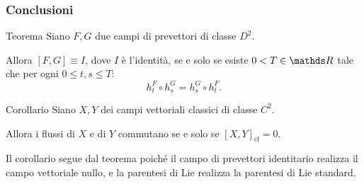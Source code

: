 \documentclass{beamer}
\newenvironment{teoremab}{\begin{alertblock}{Teorema}}{\end{alertblock}}
\newenvironment{corollariob}{\begin{alertblock}{Corollario}}{\end{alertblock}}
\begin{document}


    
    

\begin{frame}
    \frametitle{Conclusioni}

    \begin{teoremab}
        Siano $ F,G $ due campi di prevettori di classe $ D^{2} $. 

        Allora  $ [F,G]\equiv I $, dove $ I $ è l'identità, se e solo se esiste $ 0<T \in \R $ tale che per ogni $ 0\le t,s\le T $:\[h_{t}^{F}\circ h_{s}^{G} = h_{s}^{G}\circ h_{t}^{F}.\]
    \end{teoremab}
    \begin{corollariob}
        Siano $ X,Y $ dei campi vettoriali classici di classe $ C^{2} $. 
    
        Allora i flussi di $ X $ e di $ Y $ commutano se e solo se $ [X,Y]_{\text{cl}}=0 $.
    \end{corollariob}

    Il corollario segue dal teorema poiché il campo di prevettori identitario realizza il campo vettoriale nullo, e la parentesi di Lie realizza la parentesi di Lie standard. 

\end{frame}
\end{document}
